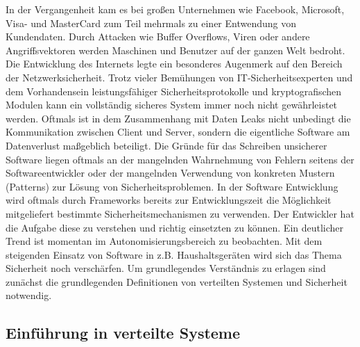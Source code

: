 \documentclass[utf8,biblatex]{lni}
\begin{document}
In der Vergangenheit kam es bei großen Unternehmen wie Facebook, Microsoft, Visa- und
MasterCard zum Teil mehrmals zu einer Entwendung von Kundendaten. Durch Attacken wie
Buffer Overflows, Viren oder andere Angriffsvektoren werden Maschinen und Benutzer auf
der ganzen Welt bedroht. Die Entwicklung des Internets legte ein besonderes Augenmerk auf
den Bereich der Netzwerksicherheit. Trotz vieler Bemühungen von IT-Sicherheitsexperten
und dem Vorhandensein leistungsfähiger Sicherheitsprotokolle und kryptografischen
Modulen kann ein vollständig sicheres System immer noch nicht gewährleistet werden.
Oftmals ist in dem Zusammenhang mit Daten Leaks nicht unbedingt die Kommunikation
zwischen Client und Server, sondern die eigentliche Software am Datenverlust maßgeblich
beteiligt. Die Gründe für das Schreiben unsicherer Software liegen oftmals an der mangelnden
Wahrnehmung von Fehlern seitens der Softwareentwickler oder der mangelnden
Verwendung von konkreten Mustern (Patterns) zur Lösung von Sicherheitsproblemen. In der
Software Entwicklung wird oftmals durch Frameworks bereits zur Entwicklungszeit die
Möglichkeit mitgeliefert bestimmte Sicherheitsmechanismen zu verwenden. Der Entwickler
hat die Aufgabe diese zu verstehen und richtig einsetzten zu können. Ein deutlicher Trend ist
momentan im Autonomisierungsbereich zu beobachten. Mit dem steigenden Einsatz von
Software in z.B. Haushaltsgeräten wird sich das Thema Sicherheit noch verschärfen. 
\newline
Um grundlegendes Verständnis zu erlagen sind zunächst die grundlegenden Definitionen von verteilten Systemen und Sicherheit notwendig.

\subsection{Einführung in verteilte Systeme}\label{EinfuerungInVerteilteSysteme}
\end{document}
